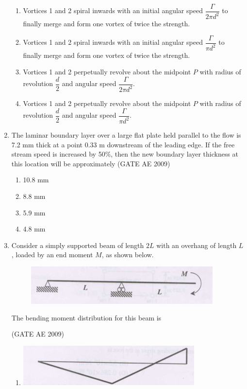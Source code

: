 \documentclass[journal,12pt,onecolumn]{IEEEtran}
\theoremstyle{remark}
\begin{document}
\begin{flushleft}
\begin{enumerate}
\begin{enumerate}
\item Vortices 1 and 2 spiral inwards with an initial angular speed $\dfrac{\Gamma}{2 \pi d^2}$ to finally merge and form one vortex of twice the strength.
\item Vortices 1 and 2 spiral inwards with an initial angular speed $\dfrac{\Gamma}{\pi d^2}$ to finally merge and form one vortex of twice the strength.
\item Vortices 1 and 2 perpetually revolve about the midpoint $P$ with radius of revolution $\dfrac{d}{2}$ and angular speed $\dfrac{\Gamma}{2 \pi d^2}$.
\item Vortices 1 and 2 perpetually revolve about the midpoint $P$ with radius of revolution $\dfrac{d}{2}$ and angular speed $\dfrac{\Gamma}{\pi d^2}$.
\end{enumerate}

\item The laminar boundary layer over a large flat plate held parallel to the flow is 7.2 mm thick at a point 0.33 m downstream of the leading edge. If the free stream speed is increased by 50\%, then the new boundary layer thickness at this location will be approximately
\hfill{(GATE AE 2009)}

\begin{multicols}{4}
\begin{enumerate}
\item 10.8 mm
\item 8.8 mm
\item 5.9 mm
\item 4.8 mm
\end{enumerate}
\end{multicols}

\item Consider a simply supported beam of length $2L$ with an overhang of length $L$, loaded by an end moment $M$, as shown below.

\begin{figure}[H]
    \centering
    \includegraphics[width=0.5\columnwidth]{figs/39.png}
    \caption{}
    \label{fig:placeholder}
\end{figure}
The bending moment distribution for this beam is

\hfill(GATE AE 2009)

\begin{enumerate}
\item  \includegraphics[width=0.5\columnwidth]{figs/A.png}


\end{enumerate}
\end{enumerate}
\end{flushleft}
\end{document}
